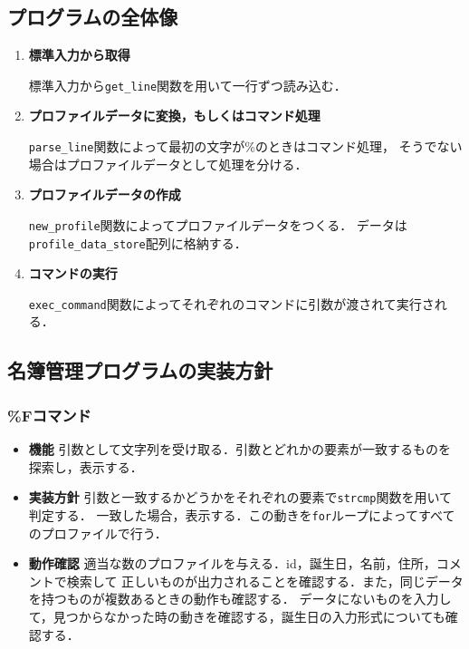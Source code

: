 \subsection{プログラムの全体像}
\begin{enumerate}
  \item \textbf{標準入力から取得}

  標準入力から\texttt{get\_line}関数を用いて一行ずつ読み込む．
  \item \textbf{プロファイルデータに変換，もしくはコマンド処理}

  \texttt{parse\_line}関数によって最初の文字が\%のときはコマンド処理，
  そうでない場合はプロファイルデータとして処理を分ける．
  \item \textbf{プロファイルデータの作成}

  \texttt{new\_profile}関数によってプロファイルデータをつくる．
  データは\texttt{profile\_data\_store}配列に格納する．
  \item \textbf{コマンドの実行}

  \texttt{exec\_command}関数によってそれぞれのコマンドに引数が渡されて実行される．
  
\end{enumerate}
\subsection{名簿管理プログラムの実装方針}
\subsubsection{\%Fコマンド}
\begin{itemize}
  \item \textbf{機能} 引数として文字列を受け取る．引数とどれかの要素が一致するものを探索し，表示する．
  \item \textbf{実装方針} 引数と一致するかどうかをそれぞれの要素で\texttt{strcmp}関数を用いて判定する．
  一致した場合，表示する．この動きを\texttt{for}ループによってすべてのプロファイルで行う．
  \item \textbf{動作確認} 適当な数のプロファイルを与える．id，誕生日，名前，住所，コメントで検索して
  正しいものが出力されることを確認する．また，同じデータを持つものが複数あるときの動作も確認する．
  データにないものを入力して，見つからなかった時の動きを確認する，誕生日の入力形式についても確認する．
\end{itemize}
